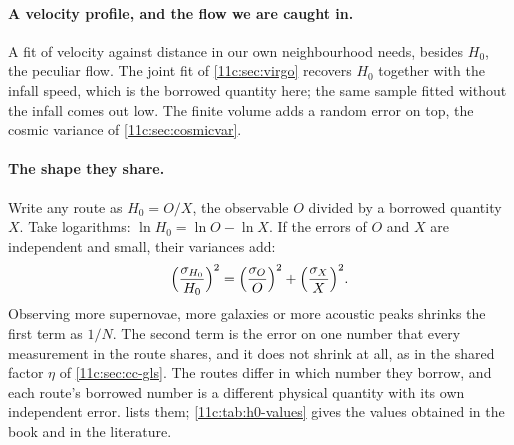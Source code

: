 \paragraph{A velocity profile, and the flow we are caught in.} A fit of velocity against
distance in our own neighbourhood needs, besides $H_0$, the peculiar flow. The joint fit of
\cref{11c:sec:virgo} recovers $H_0$ together with the infall speed, which is the borrowed
quantity here; the same sample fitted without the infall comes out low. The finite volume
adds a random error on top, the cosmic variance of \cref{11c:sec:cosmicvar}.

\paragraph{The shape they share.} Write any route as $H_0=O/X$, the observable $O$ divided by a
borrowed quantity $X$. Take logarithms: $\ln H_0=\ln O-\ln X$. If the errors of $O$ and
$X$ are independent and small, their variances add:
\begin{equation}
  \Bigl(\frac{\sigma_{H_0}}{H_0}\Bigr)^2=\Bigl(\frac{\sigma_O}{O}\Bigr)^2+\Bigl(\frac{\sigma_X}{X}\Bigr)^2 .
  \label{11c:eq:h0-budget}
\end{equation}
Observing more supernovae, more galaxies or more acoustic peaks shrinks the first term as
$1/N$. The second term is the error on one number that every measurement in the route
shares, and it does not shrink at all, as in the shared factor $\eta$ of
\cref{11c:sec:cc-gls}. The routes differ in which number they borrow, and each route's
borrowed number is a different physical quantity with its own independent error.
 lists them; \cref{11c:tab:h0-values} gives the values obtained in the book
and in the literature.

